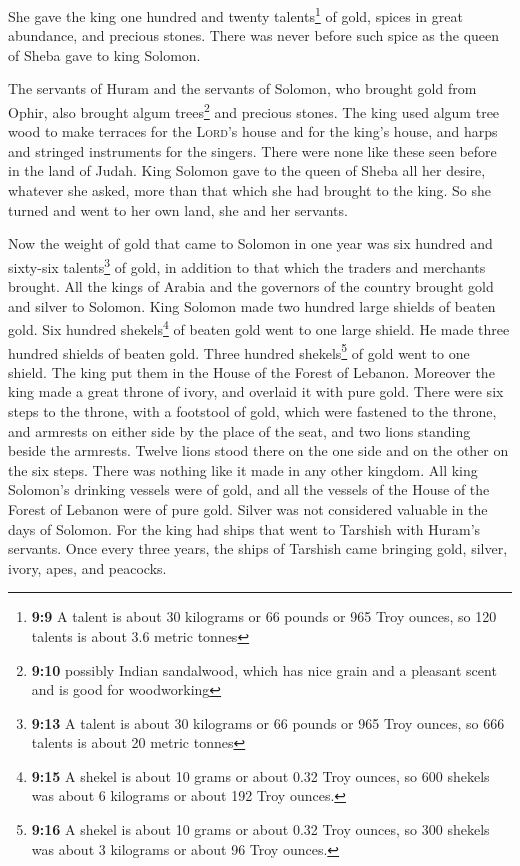  She gave the king one hundred and twenty
talents\footnote{\textbf{9:9} A talent is about 30 kilograms or 66
  pounds or 965 Troy ounces, so 120 talents is about 3.6 metric tonnes}
of gold, spices in great abundance, and precious stones. There was never
before such spice as the queen of Sheba gave to king Solomon.

 The servants of Huram and the servants of Solomon, who
brought gold from Ophir, also brought algum trees\footnote{\textbf{9:10}
  possibly Indian sandalwood, which has nice grain and a pleasant scent
  and is good for woodworking} and precious stones.  The
king used algum tree wood to make terraces for the \textsc{Lord}'s house
and for the king's house, and harps and stringed instruments for the
singers. There were none like these seen before in the land of Judah.
 King Solomon gave to the queen of Sheba all her desire,
whatever she asked, more than that which she had brought to the king. So
she turned and went to her own land, she and her servants.

 Now the weight of gold that came to Solomon in one year
was six hundred and sixty-six talents\footnote{\textbf{9:13} A talent is
  about 30 kilograms or 66 pounds or 965 Troy ounces, so 666 talents is
  about 20 metric tonnes} of gold,  in addition to that
which the traders and merchants brought. All the kings of Arabia and the
governors of the country brought gold and silver to Solomon.
 King Solomon made two hundred large shields of beaten
gold. Six hundred shekels\footnote{\textbf{9:15} A shekel is about 10
  grams or about 0.32 Troy ounces, so 600 shekels was about 6 kilograms
  or about 192 Troy ounces.} of beaten gold went to one large shield.
 He made three hundred shields of beaten gold. Three
hundred shekels\footnote{\textbf{9:16} A shekel is about 10 grams or
  about 0.32 Troy ounces, so 300 shekels was about 3 kilograms or about
  96 Troy ounces.} of gold went to one shield. The king put them in the
House of the Forest of Lebanon.  Moreover the king made a
great throne of ivory, and overlaid it with pure gold. 
There were six steps to the throne, with a footstool of gold, which were
fastened to the throne, and armrests on either side by the place of the
seat, and two lions standing beside the armrests.  Twelve
lions stood there on the one side and on the other on the six steps.
There was nothing like it made in any other kingdom.  All
king Solomon's drinking vessels were of gold, and all the vessels of the
House of the Forest of Lebanon were of pure gold. Silver was not
considered valuable in the days of Solomon.  For the king
had ships that went to Tarshish with Huram's servants. Once every three
years, the ships of Tarshish came bringing gold, silver, ivory, apes,
and peacocks.

